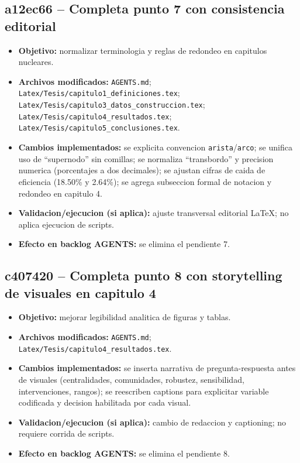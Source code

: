 \documentclass[11pt]{article}
\begin{document}
\subsection{a12ec66 -- Completa punto 7 con consistencia editorial}
\begin{itemize}
  \item \textbf{Objetivo:} normalizar terminologia y reglas de redondeo en capitulos nucleares.
  \item \textbf{Archivos modificados:} \texttt{AGENTS.md}; \texttt{Latex/Tesis/capitulo1\_definiciones.tex}; \texttt{Latex/Tesis/capitulo3\_datos\_construccion.tex}; \texttt{Latex/Tesis/capitulo4\_resultados.tex}; \texttt{Latex/Tesis/capitulo5\_conclusiones.tex}.
  \item \textbf{Cambios implementados:} se explicita convencion \texttt{arista}/\texttt{arco}; se unifica uso de ``supernodo'' sin comillas; se normaliza ``transbordo'' y precision numerica (porcentajes a dos decimales); se ajustan cifras de caida de eficiencia (18.50\% y 2.64\%); se agrega subseccion formal de notacion y redondeo en capitulo 4.
  \item \textbf{Validacion/ejecucion (si aplica):} ajuste transversal editorial \LaTeX; no aplica ejecucion de scripts.
  \item \textbf{Efecto en backlog AGENTS:} se elimina el pendiente 7.
\end{itemize}

\subsection{c407420 -- Completa punto 8 con storytelling de visuales en capitulo 4}
\begin{itemize}
  \item \textbf{Objetivo:} mejorar legibilidad analitica de figuras y tablas.
  \item \textbf{Archivos modificados:} \texttt{AGENTS.md}; \texttt{Latex/Tesis/capitulo4\_resultados.tex}.
  \item \textbf{Cambios implementados:} se inserta narrativa de pregunta-respuesta antes de visuales (centralidades, comunidades, robustez, sensibilidad, intervenciones, rangos); se reescriben captions para explicitar variable codificada y decision habilitada por cada visual.
  \item \textbf{Validacion/ejecucion (si aplica):} cambio de redaccion y captioning; no requiere corrida de scripts.
  \item \textbf{Efecto en backlog AGENTS:} se elimina el pendiente 8.
\end{itemize}
\end{document}
